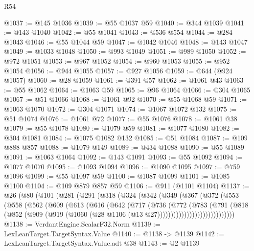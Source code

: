 \begin{lexlean}{R54}
\begin{coremodule}
@1037 := @145 @1036
@1039 := @55 @1037 @59
@1040 := @344 @1039
@1041 := @143 @1040
@1042 := @55 @1041
@1043 := @536 @554
@1044 := @284 @1043
@1046 := @55 @1044 @59
@1047 := @1042 @1046
@1048 := @143 @1047
@1049 := @1033 @1048
@1050 := @993 @1049
@1051 := @989 @1050
@1052 := @972 @1051
@1053 := @967 @1052
@1054 := @960 @1053
@1055 := @952 @1054
@1056 := @944 @1055
@1057 := @927 @1056
@1059 := @644 (@924 @1057)
@1060 := @28 @1059
@1061 := @391 @57
@1062 := @1061 @43
@1063 := @55 @1062
@1064 := @1063 @59
@1065 := @96 @1064
@1066 := @304 @1065
@1067 := @51 @1066
@1068 := @1061 @92
@1070 := @55 @1068 @59
@1071 := @1063 @1070
@1072 := @304 @1071
@1074 := @1067 @1072 @132
@1075 := @51 @1074
@1076 := @1061 @72
@1077 := @55 @1076
@1078 := @1061 @38
@1079 := @55 @1078
@1080 := @1079 @59
@1081 := @1077 @1080
@1082 := @304 @1081
@1084 := @1075 @1082 @132
@1085 := @51 @1084
@1087 := @109 @888 @857
@1088 := @1079 @149
@1089 := @434 @1088
@1090 := @55 @1089
@1091 := @1063 @1064
@1092 := @143 @1091
@1093 := @55 @1092
@1094 := @1077 @1070
@1095 := @1093 @1094
@1096 := @1090 @1095
@1097 := @759 @1096
@1099 := @55 @1097 @59
@1100 := @1087 @1099
@1101 := @1085 @1100
@1104 := @109 @879 @857 @59
@1106 := @911 (@1101 @1104)
@1137 := @26
    (@80
      (@101
        (@281
          (@291
            (@318
              (@324
                (@342
                  (@349
                    (@367
                      (@372
                        (@553
                          (@558
                            (@562
                              (@609
                                (@613
                                  (@616
                                    (@642
                                      (@717
                                        (@736
                                          (@772
                                            (@783
                                              (@791
                                                (@818
                                                  (@852
                                                    (@909
                                                      (@919
                                                        (@1060
                                                          (@28
                                                            @1106
                                                            (@13 @27)))))))))))))))))))))))))))))
@1138 := VerdantEngine.ScalarF32.Norm
@1139 := LexLeanTarget.TargetSyntax.Value
@1140 := @1138 -> @1139
@1142 := LexLeanTarget.TargetSyntax.Value.adt @38
@1143 := @2 @1139

\end{coremodule}
\end{lexlean}
